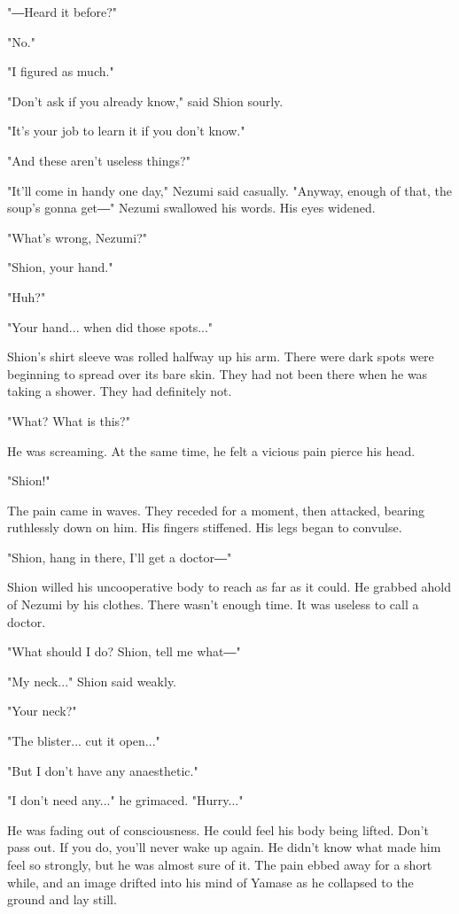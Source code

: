 "―Heard it before?"

"No."

"I figured as much."

"Don't ask if you already know," said Shion sourly.

"It's your job to learn it if you don't know."

"And these aren't useless things?"

"It'll come in handy one day," Nezumi said casually. "Anyway, enough of
that, the soup's gonna get―" Nezumi swallowed his words. His eyes
widened.

"What's wrong, Nezumi?"

"Shion, your hand."

"Huh?"

"Your hand... when did those spots..."

Shion's shirt sleeve was rolled halfway up his arm. There were dark
spots were beginning to spread over its bare skin. They had not been
there when he was taking a shower. They had definitely not.

"What? What is this?"

He was screaming. At the same time, he felt a vicious pain pierce his
head.

"Shion!"

The pain came in waves. They receded for a moment, then attacked,
bearing ruthlessly down on him. His fingers stiffened. His legs began to
convulse.

"Shion, hang in there, I'll get a doctor―"

Shion willed his uncooperative body to reach as far as it could. He
grabbed ahold of Nezumi by his clothes. There wasn't enough time. It was
useless to call a doctor.

"What should I do? Shion, tell me what―"

"My neck..." Shion said weakly.

"Your neck?"

"The blister... cut it open..."

"But I don't have any anaesthetic."

"I don't need any..." he grimaced. "Hurry..."

He was fading out of consciousness. He could feel his body being lifted.
Don't pass out. If you do, you'll never wake up again. He didn't know
what made him feel so strongly, but he was almost sure of it. The pain
ebbed away for a short while, and an image drifted into his mind of
Yamase as he collapsed to the ground and lay still.

